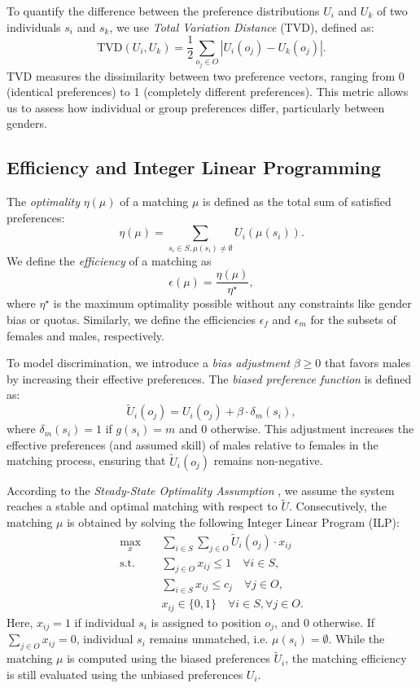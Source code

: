 \documentclass[letterpaper]{article}
\begin{document}
To quantify the difference between the preference distributions \( U_i \) and \( U_k \) of two individuals \( s_i \) and \( s_k \), we use \textit{Total Variation Distance} (TVD), defined as:
\[
\text{TVD}(U_i, U_k) = \frac{1}{2} \sum_{o_j \in O} \left| U_i(o_j) - U_k(o_j) \right|.
\]
TVD measures the dissimilarity between two preference vectors, ranging from 0 (identical preferences) to 1 (completely different preferences). This metric allows us to assess how individual or group preferences differ, particularly between genders.

\subsection*{Efficiency and Integer Linear Programming}

The \textit{optimality} \( \eta(\mu) \) of a matching \( \mu \) is defined as the total sum of satisfied preferences:
\[
\eta(\mu) = \sum_{s_i \in S, \mu(s_i) \neq \emptyset} U_i(\mu(s_i)).
\]
We define the \textit{efficiency} of a matching as
\[
\epsilon(\mu)=\frac{\eta(\mu)}{\eta^{\star}},
\]
where \(\eta^{\star}\) is the maximum optimality possible without any constraints like gender bias or quotas. Similarly, we define the efficiencies \( \epsilon_f \) and \( \epsilon_m\) for the subsets of females and males, respectively.

To model discrimination, we introduce a \textit{bias adjustment} \( \beta \geq 0 \) that favors males by increasing their effective preferences. The \textit{biased preference function} is defined as:
\[
\tilde{U}_i(o_j) = U_i(o_j) + \beta \cdot \delta_m(s_i),
\]
where \( \delta_m(s_i) = 1 \) if \( g(s_i) = m \) and \( 0 \) otherwise. This adjustment increases the effective preferences (and assumed skill) of males relative to females in the matching process, ensuring that \( \tilde{U}_i(o_j) \) remains non-negative.


According to the \textit{Steady-State Optimality Assumption} \cite{lawrence2020}, we assume the system reaches a stable and optimal matching with respect to \( \tilde{U} \). Consecutively, the matching \( \mu \) is obtained by solving the following Integer Linear Program (ILP):
\begin{align*}
\max_{x} \quad & \sum_{i \in S} \sum_{j \in O} \tilde{U}_i(o_j) \cdot x_{ij} \\
\text{s.t.} \quad & \sum_{j \in O} x_{ij} \leq 1 \quad \forall i \in S, \\
& \sum_{i \in S} x_{ij} \leq c_j \quad \forall j \in O, \\
& x_{ij} \in \{0, 1\} \quad \forall i \in S, \forall j \in O.
\end{align*}
Here, \( x_{ij} = 1 \) if individual \( s_i \) is assigned to position \( o_j \), and \( 0 \) otherwise. If \( \sum_{j \in O} x_{ij} = 0 \), individual \( s_i \) remains unmatched, i.e. \(\mu(s_i) = \emptyset\). While the matching \( \mu \) is computed using the biased preferences \( \tilde{U}_i \), the matching efficiency is still evaluated using the unbiased preferences \( U_i \).
\end{document}
